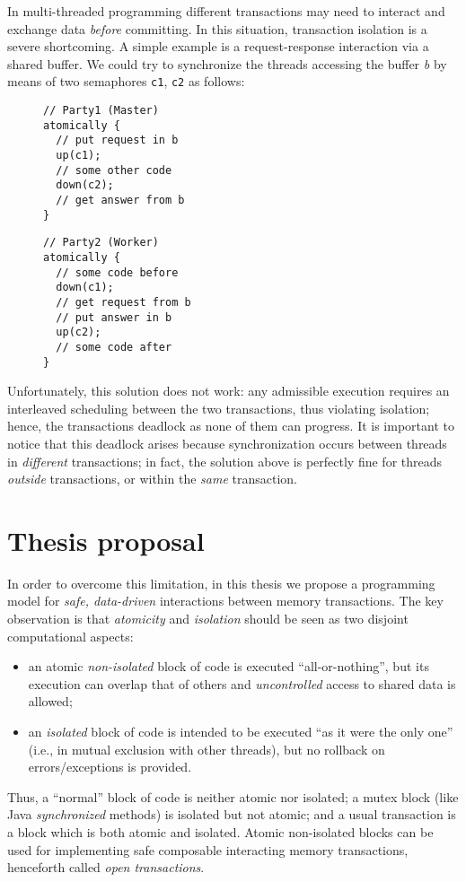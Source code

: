 In multi-threaded programming different transactions may need to interact and exchange data \emph{before} committing.
In this situation, transaction isolation is a severe shortcoming.
A simple example is a request-response interaction via a shared buffer.
We could try to synchronize the threads accessing the buffer \emph{b} by means of two semaphores \verb|c1|, \verb|c2| as follows:
\begin{figure}[h]
\centering
\begin{minipage}[t]{0.4\textwidth}
\begin{BVerbatim}[baseline=t]
// Party1 (Master)
atomically {
  // put request in b
  up(c1);
  // some other code
  down(c2);
  // get answer from b
}
\end{BVerbatim}
\end{minipage}
\begin{minipage}[t]{0.3\textwidth}
\begin{BVerbatim}[baseline=t]
// Party2 (Worker)
atomically {
  // some code before
  down(c1);
  // get request from b
  // put answer in b
  up(c2);
  // some code after
}
\end{BVerbatim}
\end{minipage}
\end{figure}
\newpage
Unfortunately, this solution does not work: any admissible execution requires an interleaved scheduling between the two transactions, thus violating isolation; hence, the transactions deadlock as none of them can progress.
It is important to notice that this deadlock arises because synchronization occurs between threads in \emph{different} transactions;
in fact, the solution above is perfectly fine for threads \emph{outside} transactions, or within the \emph{same} transaction.

\section{Thesis proposal}
In order to overcome this limitation, in this thesis we propose a programming model for \emph{safe, data-driven} interactions between memory transactions.
The key observation is that \emph{atomicity} and \emph{isolation} should be seen as two disjoint computational aspects:
\begin{itemize}
\item an atomic \emph{non-isolated} block of code is executed ``all-or-nothing'', but its execution can overlap that of others and \emph{uncontrolled} access to shared data is allowed;
\item an \emph{isolated} block of code is intended to be executed ``as it were the only one'' (i.e., in mutual exclusion with other threads), but no rollback on errors/exceptions is provided.
\end{itemize}
Thus, a ``normal'' block of code is neither atomic nor isolated; a mutex block (like Java \emph{synchronized} methods) is isolated but not atomic; and a usual transaction is a block which is both atomic and isolated.
Atomic non-isolated blocks can be used for implementing safe composable interacting memory transactions, henceforth called \emph{open transactions}.

